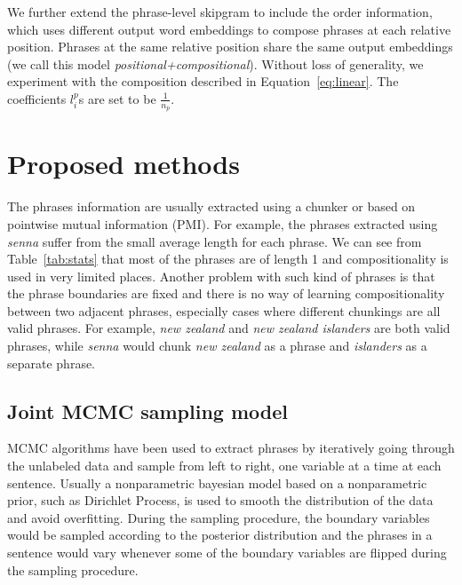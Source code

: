 We further extend the phrase-level skipgram to include the order information, which
uses different output word embeddings to compose phrases at each relative position. Phrases at the same relative position share the same
output embeddings (we call this model \textit{positional+compositional}).
Without loss of generality, we experiment with the composition
described in Equation~\ref{eq:linear}. The coefficients $l_i^p$s are set to be $\frac{1}{n_p}$.
\section{Proposed methods}
\begin{table}
\centering
\begin{center}
\caption{\small{Statistics of phrase length distributions (m/million)}}
\label{tab:stats}
\end{center}
\end{table}
The phrases information are usually extracted using a chunker or based on pointwise mutual information (PMI).
For example, the phrases extracted using \textit{senna} suffer from the small average length for each phrase. We can see from 
Table~\ref{tab:stats} that most of the phrases are of length 1 and compositionality is used in very limited places.
Another problem with such kind of phrases is that the phrase boundaries are fixed and there is no way of learning compositionality
between two adjacent phrases, especially cases where different chunkings are all valid phrases. For example,
\textit{new zealand} and \textit{new zealand islanders} are both valid phrases, while \textit{senna} would chunk \textit{new zealand}
as a phrase and \textit{islanders} as a separate phrase.
\subsection{Joint MCMC sampling model}
MCMC algorithms have been used to extract phrases by iteratively going through the unlabeled data and sample from left to right, one variable at a time
at each sentence. Usually a nonparametric bayesian model based on a nonparametric prior, such as Dirichlet Process, is used to smooth the distribution of
the data and avoid overfitting. During the sampling procedure, the boundary variables would be sampled according to the posterior distribution and the phrases
in a sentence would vary whenever some of the boundary variables are flipped during the sampling procedure.


